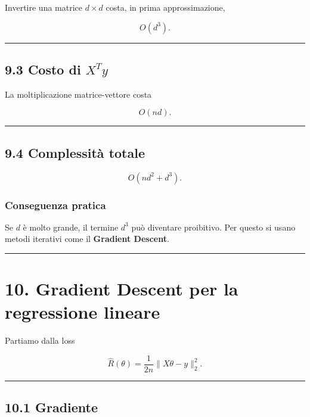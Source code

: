 \documentclass[
]{article}
\begin{document}
Invertire una matrice \(d\times d\) costa, in prima approssimazione,

\[
O(d^3).
\]

\begin{center}\rule{0.5\linewidth}{0.5pt}\end{center}

\subsection{\texorpdfstring{9.3 Costo di
\(X^Ty\)}{9.3 Costo di X\^{}Ty}}\label{costo-di-xty}

La moltiplicazione matrice-vettore costa

\[
O(nd).
\]

\begin{center}\rule{0.5\linewidth}{0.5pt}\end{center}

\subsection{9.4 Complessità totale}\label{complessituxe0-totale}

\[
O(nd^2 + d^3).
\]

\subsubsection{Conseguenza pratica}\label{conseguenza-pratica}

Se \(d\) è molto grande, il termine \(d^3\) può diventare proibitivo.
Per questo si usano metodi iterativi come il \textbf{Gradient Descent}.

\begin{center}\rule{0.5\linewidth}{0.5pt}\end{center}

\section{10. Gradient Descent per la regressione
lineare}\label{gradient-descent-per-la-regressione-lineare}

Partiamo dalla loss

\[
\hat R(\theta)=\frac{1}{2n}\|X\theta-y\|_2^2.
\]

\begin{center}\rule{0.5\linewidth}{0.5pt}\end{center}

\subsection{10.1 Gradiente}\label{gradiente-1}
\end{document}
